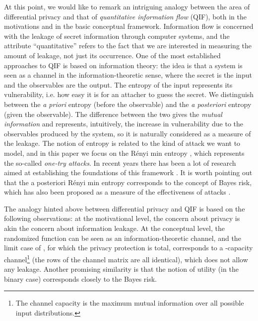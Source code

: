 \documentclass{llncs}
\begin{document}
At this point, we would like to remark an intriguing analogy between the area of differential privacy and that of \emph{quantitative information flow} (QIF), both in the motivations and in the basic conceptual framework. 
Information flow is concerned with the leakage of secret information through computer systems, and the attribute ``quantitative'' refers to the fact that we are interested in measuring the amount of leakage, not just its occurrence. 
One of the most established approaches to QIF is based on information theory: the idea is that 
a system is seen as a channel in the information-theoretic sense, where the secret is the input and the observables are the output. The entropy of the input represents its vulnerability, i.e. how easy it is for an attacher to guess the secret. 
We distinguish between the \emph{ a priori} entropy (before the observable) and the \emph{a posteriori} entropy (given the observable). The difference between the two gives the \emph{mutual information} and represents, intuitively, the increase in vulnerability 
due to the observables produced by the system, so it is naturally considered as a measure of the leakage. 
The notion of entropy is related to the kind of attack we want to model, and in this paper we focus on the  R\'enyi min entropy \cite{Renyi:61:Berkeley}, which represents the so-called \emph{one-try attacks}. 
In recent years there has been a lot of research aimed at establishing the foundations of this framework \cite{Smith:09:FOSSACS,Braun:09:MFPS,Kopf:10:CSF,Andres:10:TACAS,Boreale:11:FOSSACS}.
It is worth pointing out that the a posteriori R\'enyi min entropy corresponds to the concept of Bayes risk, which has also been proposed as a measure of the effectiveness of attacks \cite{Chatzikokolakis:07:CSF,Braun:08:FOSSACS,McIver:10:ICALP}.

The analogy hinted above between differential privacy and QIF is based on the following observations:
at the motivational level, the concern about privacy is akin the concern about information leakage.  
At the conceptual level, the randomized function  can be seen as an information-theoretic channel, 
and the limit case of , for which the privacy protection is total,  
corresponds to a -capacity channel\footnote{The channel capacity is the maximum mutual information over all possible input distributions.} (the rows of the channel matrix are all identical), which does not allow any leakage. Another promising similarity is that the notion of utility (in the binary case) corresponds closely to the Bayes risk. 
\end{document}
